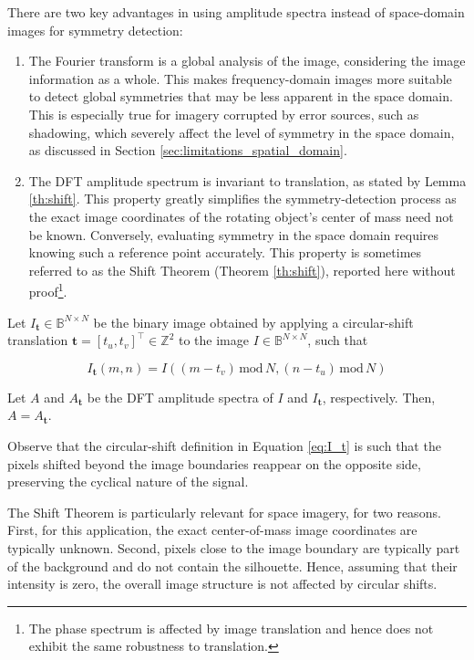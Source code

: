 There are two key advantages in using amplitude spectra instead of space-domain images for symmetry detection:

\begin{enumerate}
    \item The Fourier transform is a global analysis of the image, considering the image information as a whole. This makes frequency-domain images more suitable to detect global symmetries that may be less apparent in the space domain. This is especially true for imagery corrupted by error sources, such as shadowing, which severely affect the level of symmetry in the space domain, as discussed in Section \ref{sec:limitations_spatial_domain}.
    \item The DFT amplitude spectrum is invariant to translation, as stated by Lemma \ref{th:shift}. This property greatly simplifies the symmetry-detection process as the exact image coordinates of the rotating object's center of mass need not be known. Conversely, evaluating symmetry in the space domain requires knowing such a reference point accurately. This property is sometimes referred to as the Shift Theorem (Theorem \ref{th:shift}), reported here without proof\footnote{The phase spectrum is affected by image translation and hence does not exhibit the same robustness to translation.}.
\end{enumerate}

\begin{theorem}
    \label{th:shift}
    Let $I_{\mathbf{t}}\in \mathbb{B}^{N\times N}$ be the binary image obtained by applying a circular-shift translation $\mathbf{t}=[t_u,t_v]^\top \in \mathbb{Z}^2$ to the image $I\in \mathbb{B}^{N\times N}$, such that

    \begin{equation}
    \label{eq:I_t}
        I_\mathbf{t}(m, n) = I\left((m - t_v) \, \mathrm{mod} \, N, (n - t_u) \, \mathrm{mod} \, N \right)
    \end{equation}
    
    Let $A$ and $A_\mathbf{t}$ be the DFT amplitude spectra of $I$ and $I_\mathbf{t}$, respectively. Then, $A = A_\mathbf{t}$.
\end{theorem}

Observe that the circular-shift definition in Equation \ref{eq:I_t} is such that the pixels shifted beyond the image boundaries reappear on the opposite side, preserving the cyclical nature of the signal.

The Shift Theorem is particularly relevant for space imagery, for two reasons. First, for this application, the exact center-of-mass image coordinates are typically unknown. Second, pixels close to the image boundary are typically part of the background and do not contain the silhouette. Hence, assuming that their intensity is zero, the overall image structure is not affected by circular shifts.

